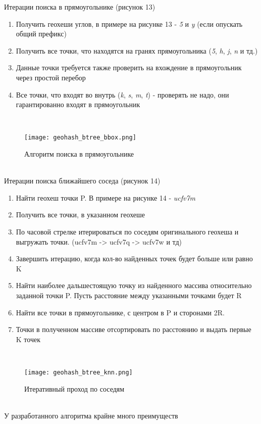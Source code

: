 Итерации поиска в прямоугольнике (рисунок 13)
\begin{enumerate}
    \item Получить геохеши углов, в примере на рисунке 13 - \textit{5} и \textit{y} (если опускать общий префикс)
    \item Получить все точки, что находятся на гранях прямоугольника (\textit{5}, \textit{h}, \textit{j}, \textit{n} и тд.)
    \item Данные точки требуется также проверить на вхождение в прямоугольник через простой перебор
    \item Все точки, что входят во внутрь (\textit{k}, \textit{s}, \textit{m}, \textit{t}) - проверять не надо, они гарантированно входят в прямоугольник
\end{enumerate}
  \\
\begin{figure}[h]
    \centering
    \texttt{[image: geohash\_btree\_bbox.png]}
    \caption{Алгоритм поиска в прямоугольнике}
\end{figure}
  \\
Итерации поиска ближайшего соседа (рисунок 14)
\begin{enumerate}
    \item Найти геохеш точки P. В примере на рисунке 14 - \textit{ucfv7m}
    \item Получить все точки, в указанном геохеше
    \item По часовой стрелке итерироваться по соседям оригинального геохеша и выгружать точки. (ucfv7m -> ucfv7q -> ucfv7w и тд)
    \item Завершить итерацию, когда кол-во найденных точек будет больше или равно K
    \item Найти наиболее дальшестоящую точку из найденного массива относительно заданной точки P. Пусть расстояние между указанными точками будет R 
    \item Найти все точки в прямоугольнике, с центром в P и сторонами 2R.
    \item Точки в полученном массиве отсортировать по расстоянию и выдать первые K точек
\end{enumerate}
  \\
\begin{figure}[h]
    \centering
    \texttt{[image: geohash\_btree\_knn.png]}
    \caption{Итеративный проход по соседям}
\end{figure}
  \\
У разработанного алгоритма крайне много преимуществ
